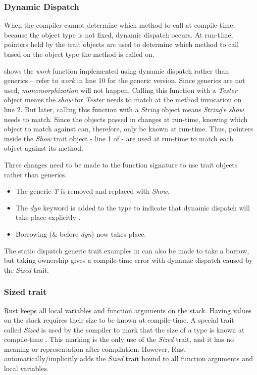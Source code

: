 \subsubsection{Dynamic Dispatch}
When the compiler cannot determine which method to call at compile-time, because the object type is not fixed, dynamic dispatch \cite{alexandrescu_01_01, klabnik_2019_01, abadi_12_01} occurs.
At run-time, pointers held by the trait objects are used to determine which method to call \cite{klabnik_2019_01} based on the object type the method is called on.

 shows the \textit{work} function implemented using dynamic dispatch rather than generics -- refer to \textit{work} in  line 10 for the generic version.
Since generics are not used, \textit{monomorphization} will not happen.
Calling this function with a \textit{Tester} object means the \textit{show} for \textit{Tester} needs to match at the method invocation on line 2.
But later, calling this function with a \textit{String} object means \textit{String}'s \textit{show} needs to match.
Since the objects passed in changes at run-time, knowing which object to match against can, therefore, only be known at run-time.
Thus, pointers inside the \textit{Show} trait object - line 1 of  - are used at run-time to match each object against its method.


Three changes need to be made to the function signature to use trait objects rather than generics.
\begin{itemize}
	\item The generic \textit{T} is removed and replaced with \textit{Show}.
	\item The \textit{dyn} keyword is added to the type to indicate that dynamic dispatch will take place explicitly \cite{klabnik_2019_01}.
	\item Borrowing (\& before \textit{dyn}) now takes place.
\end{itemize}

The static dispatch generic trait examples in  can also be made to take a borrow, but taking ownership gives a compile-time error with dynamic dispatch caused by the \textit{Sized} trait.

\subsubsection{Sized trait}
Rust keeps all local variables and function arguments on the stack.
Having values on the stack requires their size to be known at compile-time.
A special trait called \textit{Sized} is used by the compiler to mark that the size of a type is known at compile-time \cite{klabnik_2019_01}.
This marking is the only use of the \textit{Sized} trait, and it has no meaning or representation after compilation.
However, Rust automatically/implicitly adds the \textit{Sized} trait bound to all function arguments and local variables.

